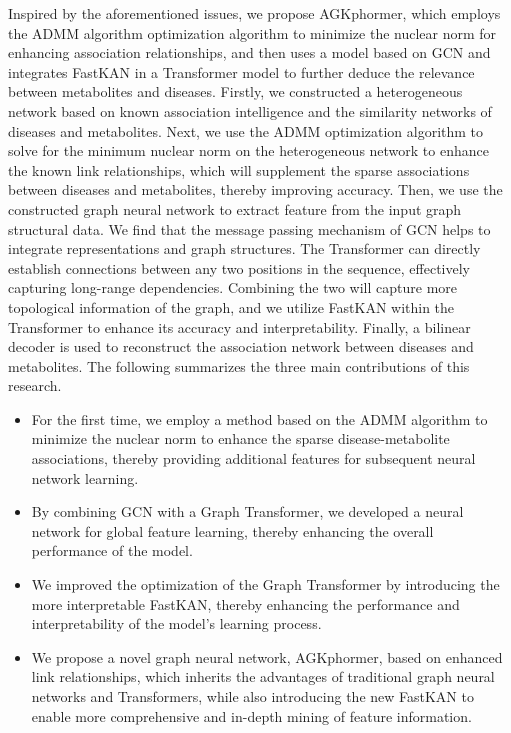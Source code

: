 \documentclass[lettersize,journal]{IEEEtran}
\begin{document}
Inspired by the aforementioned issues, we propose AGKphormer, which employs the ADMM algorithm optimization algorithm to minimize the nuclear norm for enhancing association relationships, and then uses a model based on GCN and integrates FastKAN in a Transformer model to further deduce the relevance between metabolites and diseases. 
Firstly, we constructed a heterogeneous network based on known association intelligence and the similarity networks of diseases and metabolites. Next, we use the ADMM \cite{MAL-016} optimization algorithm to solve for the minimum nuclear norm on the heterogeneous network to enhance the known link relationships, which will supplement the sparse associations between diseases and metabolites, thereby improving accuracy.
Then, we use the constructed graph neural network to extract feature from the input graph structural data. We find that the message passing mechanism of GCN helps to integrate representations and graph structures. 
The Transformer can directly establish connections between any two positions in the sequence, effectively capturing long-range dependencies. 
Combining the two will capture more topological information of the graph, and we utilize FastKAN within the Transformer to enhance its accuracy and interpretability. 
Finally, a bilinear decoder is used to reconstruct the association network between diseases and metabolites. The following summarizes the three main contributions of this research.
\begin{itemize}
  \item For the first time, we employ a method based on the ADMM algorithm to minimize the nuclear norm to enhance the sparse disease-metabolite associations, thereby providing additional features for subsequent neural network learning.
  
  \item By combining GCN with a Graph Transformer, we developed a neural network for global feature learning, thereby enhancing the overall performance of the model.
  
  \item We improved the optimization of the Graph Transformer by introducing the more interpretable FastKAN, thereby enhancing the performance and interpretability of the model's learning process.
  
  \item We propose a novel graph neural network, AGKphormer, based on enhanced link relationships, which inherits the advantages of traditional graph neural networks and Transformers, while also introducing the new FastKAN to enable more comprehensive and in-depth mining of feature information.
\end{itemize}
\end{document}
